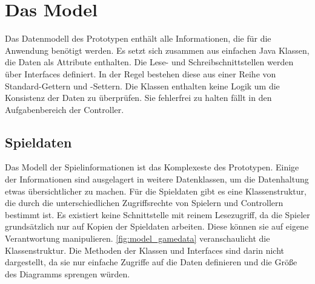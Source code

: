 \documentclass[
							a4paper, 
							11pt, 
							openany, 
							liststotoc,
							parskip=half, 
   							headings=normal
						]{scrreprt}
\begin{document}
{\clearpage

\section{Das Model} \label{se:anwendung_model}
Das Datenmodell des Prototypen enthält alle Informationen, die für die Anwendung benötigt werden. Es setzt sich zusammen aus einfachen Java Klassen, die Daten als Attribute enthalten. Die Lese- und Schreibschnittstellen werden über Interfaces definiert. In der Regel bestehen diese aus einer Reihe von Standard-Gettern und -Settern.\newline
Die Klassen enthalten keine Logik um die Konsistenz der Daten zu überprüfen. Sie fehlerfrei zu halten fällt in den Aufgabenbereich der Controller.

\clearpage

\subsection{Spieldaten} \label{sse:anwendung_model_game}
Das Modell der Spielinformationen ist das Komplexeste des Prototypen. Einige der Informationen sind ausgelagert in weitere Datenklassen, um die Datenhaltung etwas übersichtlicher zu machen.\newline
Für die Spieldaten gibt es eine Klassenstruktur, die durch die unterschiedlichen Zugriffsrechte von Spielern und Controllern bestimmt ist. Es existiert keine Schnittstelle mit reinem Lesezugriff, da die Spieler grundsätzlich nur auf Kopien der Spieldaten arbeiten. Diese können sie auf eigene Verantwortung manipulieren.
\autoref{fig:model_gamedata} veranschaulicht die Klassenstruktur. Die Methoden der Klassen und Interfaces sind darin nicht dargestellt, da sie nur einfache Zugriffe auf die Daten definieren und die Größe des Diagramms sprengen würden.

}
\end{document}
